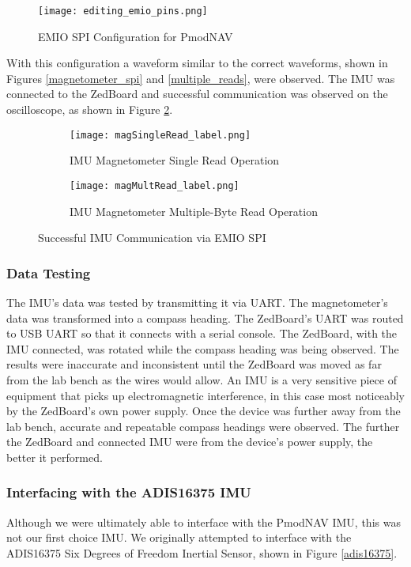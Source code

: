 \begin{figure}[H]
	\centerline{\texttt{[image: editing\_emio\_pins.png]}}
	\caption{EMIO SPI Configuration for PmodNAV}
	\label{emio_config}
\end{figure}

With this configuration a waveform similar to the correct waveforms, shown in Figures \ref{magnetometer_spi} and \ref{multiple_reads}, were observed. The IMU was connected to the ZedBoard and successful communication was observed on the oscilloscope, as shown in Figure \ref{OTPHJ}.

\begin{figure}[H] 
	\begin{subfigure}{1\textwidth}
	\centering
		\texttt{[image: magSingleRead\_label.png]}
		\caption{IMU Magnetometer Single Read Operation}
	\end{subfigure}
	\begin{subfigure}{1\textwidth}
	\centering
		\texttt{[image: magMultRead\_label.png]}
		\caption{IMU Magnetometer Multiple-Byte Read Operation}
	\end{subfigure}
	\caption{Successful IMU Communication via EMIO SPI}
	\label{OTPHJ}
\end{figure}

\subsubsection{Data Testing}
The IMU's data was tested by transmitting it via UART. The magnetometer's data was transformed into a compass heading. The ZedBoard's UART was routed to USB UART so that it connects with a serial console. The ZedBoard, with the IMU connected, was rotated while the compass heading was being observed. The results were inaccurate and inconsistent until the ZedBoard was moved as far from the lab bench as the wires would allow. An IMU is a very sensitive piece of equipment that picks up electromagnetic interference, in this case most noticeably by the ZedBoard's own power supply. Once the device was further away from the lab bench, accurate and repeatable compass headings were observed. The further the ZedBoard and connected IMU were from the device's power supply, the better it performed.

\subsubsection{Interfacing with the ADIS16375 IMU}
Although we were ultimately able to interface with the PmodNAV IMU, this was not our first choice IMU. We originally attempted to interface with the ADIS16375 Six Degrees of Freedom Inertial Sensor, shown in Figure \ref{adis16375}.

